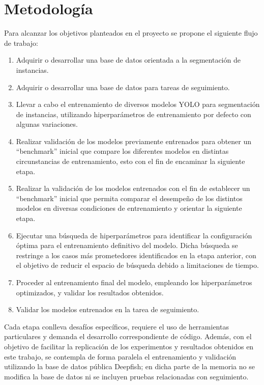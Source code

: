 \section{Metodología}
Para alcanzar los objetivos planteados en el proyecto se propone el siguiente flujo de trabajo:

\begin{enumerate}
    \item Adquirir o desarrollar una base de datos orientada a la segmentación de instancias.
    \item Adquirir o desarrollar una base de datos para tareas de seguimiento.
    \item Llevar a cabo el entrenamiento de diversos modelos YOLO para segmentación de instancias, utilizando hiperparámetros de entrenamiento por defecto con algunas variaciones.
    \item Realizar validación de los modelos previamente entrenados para obtener un ``benchmark'' inicial que compare los diferentes modelos en distintas circunstancias de entrenamiento, esto con el fin de encaminar la siguiente etapa.
    \item Realizar la validación de los modelos entrenados con el fin de establecer un ``benchmark'' inicial que permita comparar el desempeño de los distintos modelos en diversas condiciones de entrenamiento y orientar la siguiente etapa.
    \item Ejecutar una búsqueda de hiperparámetros para identificar la configuración óptima para el entrenamiento definitivo del modelo. Dicha búsqueda se restringe a los casos más prometedores identificados en la etapa anterior, con el objetivo de reducir el espacio de búsqueda debido a limitaciones de tiempo.
    \item Proceder al entrenamiento final del modelo, empleando los hiperparámetros optimizados, y validar los resultados obtenidos.
    \item Validar los modelos entrenados en la tarea de seguimiento.
\end{enumerate}

Cada etapa conlleva desafíos específicos, requiere el uso de herramientas particulares y demanda el desarrollo correspondiente de código. Además, con el objetivo de facilitar la replicación de los experimentos y resultados obtenidos en este trabajo, se contempla de forma paralela el entrenamiento y validación utilizando la base de datos pública Deepfish; en dicha parte de la memoria no se modifica la base de datos ni se incluyen pruebas relacionadas con seguimiento.

